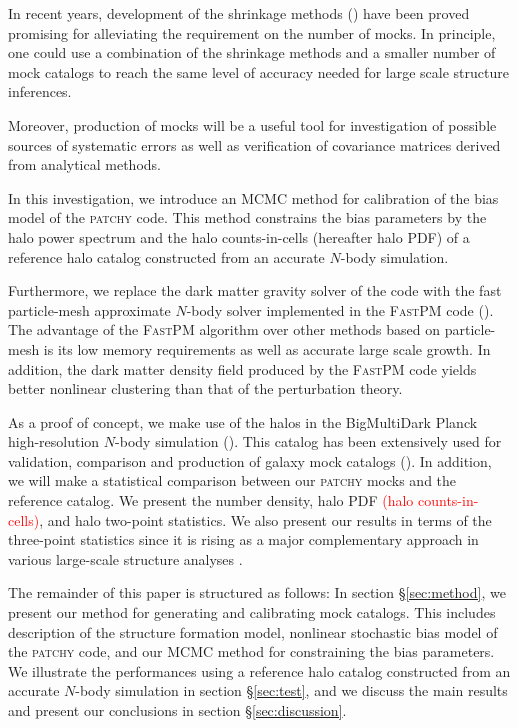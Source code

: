 \documentclass[english,usenatbib]{mn2e}
\newcommand{\tod}[1]{{\textcolor{red}{ #1}}}
\begin{document}
In recent years, development of the shrinkage methods (\citealt{ledoit2004,pope2008,ledoit2012,joachimi2016,simpson2016}) have been proved promising for alleviating the requirement on the number of mocks. In principle, one could use a combination of the shrinkage methods and a smaller number of mock catalogs to reach the same level of accuracy needed for large scale structure inferences.    

Moreover, production of mocks will be a useful tool for investigation of possible sources of systematic errors as well as verification of covariance matrices derived from analytical methods.

In this investigation, we introduce an MCMC method for calibration of the bias model of the \textsc{patchy} code. This method constrains the bias parameters by the halo power spectrum and the halo counts-in-cells (hereafter halo PDF) of a  reference halo catalog constructed from an accurate $N$-body simulation. 

Furthermore, we replace the dark matter gravity solver of the code with the fast particle-mesh approximate $N$-body solver implemented in the \textsc{FastPM} code (\citealt{fastpm}). The advantage of the \textsc{FastPM} algorithm over other methods based on particle-mesh is its low memory requirements as well as accurate large scale growth. In addition, the dark matter density field produced by the \textsc{FastPM} code yields better nonlinear clustering than that of the perturbation theory. 

As a proof of concept, we make use of the halos in the BigMultiDark Planck high-resolution $N$-body simulation (\citealt{multidark}). This catalog has been extensively used for validation, comparison and production of galaxy mock catalogs (\citealt{chuang2015,zhao2015,kitaura2016,sergio2016}). 
In addition, we will make a statistical comparison between our \textsc{patchy} mocks and the reference catalog. We present the number density, halo PDF \tod{(halo counts-in-cells)}, and halo two-point statistics. 
We also present our results in terms of the three-point statistics since it is rising as a major complementary approach in various large-scale structure analyses \citep{slepian2015,gill2015a,gill2015b,guo2016,slepian2016a,slepian2016b,gill2017}. 


The remainder of this paper is structured as follows: In section \S \ref{sec:method}, we present our method for generating and calibrating mock catalogs. This includes description of the structure formation model, nonlinear stochastic bias model of the \textsc{patchy} code, and our MCMC method for constraining the bias parameters. We illustrate the performances using a reference halo catalog constructed from an accurate $N$-body simulation in section \S \ref{sec:test}, and we discuss the main results and present our conclusions in section \S \ref{sec:discussion}.
\end{document}
